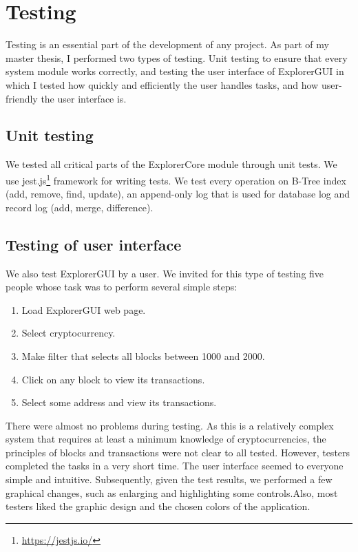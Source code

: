 \chapter{Testing}
Testing is an essential part of the development of any project. As part of my master thesis, I performed two types of testing. Unit testing to ensure that every system module works correctly, and testing the user interface of ExplorerGUI in which I tested how quickly and efficiently the user handles tasks, and how user-friendly the user interface is.

\section{Unit testing}
We tested all critical parts of the ExplorerCore module through unit tests. We use jest.js\footnote{\url{https://jestjs.io/}} framework for writing tests. We test every operation on B-Tree index (add, remove, find, update), an append-only log that is used for database log and record log (add, merge, difference).


\section{Testing of user interface}
We also test ExplorerGUI by a user. We invited for this type of testing five people whose task was to perform several simple steps:
\begin{enumerate}
    \item Load ExplorerGUI web page.
    \item Select cryptocurrency.
    \item Make filter that selects all blocks between 1000 and 2000.
    \item Click on any block to view its transactions.
    \item Select some address and view its transactions.
\end{enumerate}

There were almost no problems during testing. As this is a relatively complex system that requires at least a minimum knowledge of cryptocurrencies, the principles of blocks and transactions were not clear to all tested. However, testers completed the tasks in a very short time. The user interface seemed to everyone simple and intuitive. Subsequently, given the test results, we performed a few graphical changes, such as enlarging and highlighting some controls.Also, most testers liked the graphic design and the chosen colors of the application.
